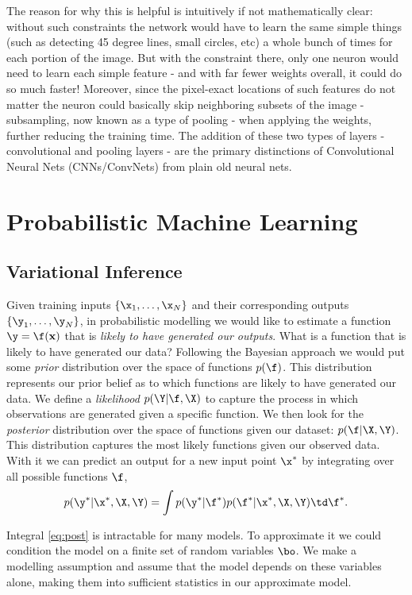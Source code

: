 The reason for why this is helpful is intuitively if not mathematically clear: without such constraints the network would have to learn the same simple things (such as detecting 45 degree lines, small circles, etc) a whole bunch of times for each portion of the image. But with the constraint there, only one neuron would need to learn each simple feature - and with far fewer weights overall, it could do so much faster! Moreover, since the pixel-exact locations of such features do not matter the neuron could basically skip neighboring subsets of the image - subsampling, now known as a type of pooling - when applying the weights, further reducing the training time. The addition of these two types of layers - convolutional and pooling layers - are the primary distinctions of Convolutional Neural Nets (CNNs/ConvNets) from plain old neural nets.


\section{Probabilistic Machine Learning}
\subsection{Variational Inference}

Given training inputs $\{ \x_1, \hdots, \x_N \}$ and their corresponding outputs $\{\y_1, \hdots, \y_N\}$, in probabilistic modelling we would like to estimate a function $\y = \f(\mathbf{x})$ that is \textit{likely to have generated our outputs}. 
What is a function that is likely to have generated our data? Following the Bayesian approach we would put some \textit{prior} distribution over the space of functions $p(\f)$. This distribution represents our prior belief as to which functions are likely to have generated our data. 
We define a \textit{likelihood} $p(\Y | \f, \X)$ to capture the process in which observations are generated given a specific function.
We then look for the \textit{posterior} distribution over the space of functions given our dataset: $p(\f | \X, \Y)$.
This distribution captures the most likely functions given our observed data.
With it we can predict an output for a new input point $\x^*$ by integrating over all possible functions $\f$,
\begin{align} \label{eq:post}
p(\y^* | \x^*, \X, \Y) = \int p(\y^* | \f^*) p(\f^* | \x^*, \X, \Y) \td \f^*.
\end{align}

Integral \eqref{eq:post} is intractable for many models. 
To approximate it we could condition the model on a finite set of random variables $\bo$. We make a modelling assumption and assume that the model depends on these variables alone, making them into sufficient statistics in our approximate model.

